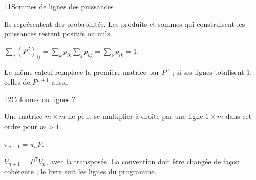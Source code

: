 \begin{corrige}{11}{Sommes de lignes des puissances}
\begin{questions}
\item Ils représentent des probabilités. Les produits et sommes qui construisent les puissances restent positifs ou nuls.
\item $\sum_j(P^2)_{ij}=\sum_kp_{ik}\sum_jp_{kj}=\sum_kp_{ik}=1$.
\item Le même calcul remplace la première matrice par $P^n$ ; si ses lignes totalisent $1$, celles de $P^{n+1}$ aussi.
\end{questions}
\end{corrige}
\begin{corrige}{12}{Colonnes ou lignes ?}
\begin{questions}
\item Une matrice $m\times m$ ne peut se multiplier à droite par une ligne $1\times m$ dans cet ordre pour $m>1$.
\item $\pi_{n+1}=\pi_nP$.
\item $V_{n+1}=P^{\mathsf T}V_n$, avec la transposée. La convention doit être changée de façon cohérente ; le livre suit les lignes du programme.
\end{questions}
\end{corrige}
